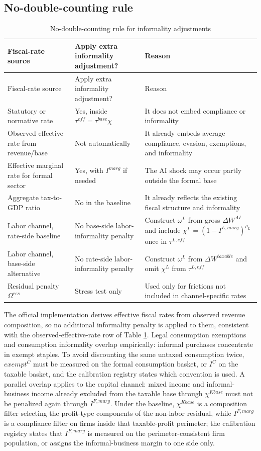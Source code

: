 \documentclass[11pt,a4paper]{article}
\begin{document}
\subsection{No-double-counting rule}

\begin{longtable}{p{}p{}p{}}
\caption{No-double-counting rule for informality adjustments}\label{tab:no_double_counting_informality}\\
\toprule
Fiscal-rate source & Apply extra informality adjustment? & Reason \\
\midrule
\endfirsthead
\toprule
Fiscal-rate source & Apply extra informality adjustment? & Reason \\
\midrule
\endhead
Statutory or normative rate & Yes, inside $\tau^{eff}=\tau^{base}\chi$ & It does not embed compliance or informality \\
Observed effective rate from revenue/base & Not automatically & It already embeds average compliance, evasion, exemptions, and informality \\
Effective marginal rate for formal sector & Yes, with $I^{marg}$ if needed & The AI shock may occur partly outside the formal base \\
Aggregate tax-to-GDP ratio & No in the baseline & It already reflects the existing fiscal structure and informality \\
Labor channel, rate-side baseline & No base-side labor-informality penalty & Construct $\omega^L$ from gross $\Delta W^{AI}$ and include $\chi^L=(1-I^{L,marg})^{\rho_L}$ once in $\tau^{L,eff}$ \\
Labor channel, base-side alternative & No rate-side labor-informality penalty & Construct $\omega^L$ from $\Delta W^{taxable}$ and omit $\chi^L$ from $\tau^{L,eff}$ \\
Residual penalty $\Omega^{res}$ & Stress test only & Used only for frictions not included in channel-specific rates \\
\bottomrule
\end{longtable}
The official implementation derives effective fiscal rates from observed revenue composition, so no additional informality penalty is applied to them, consistent with the observed-effective-rate row of Table \ref{tab:no_double_counting_informality}.
Legal consumption exemptions and consumption informality overlap empirically: informal purchases concentrate in exempt staples. To avoid discounting the same untaxed consumption twice, $exempt^C$ must be measured on the formal consumption basket, or $I^C$ on the taxable basket, and the calibration registry states which convention is used. A parallel overlap applies to the capital channel: mixed income and informal-business income already excluded from the taxable base through $\chi^{Kbase}$ must not be penalized again through $I^{F,marg}$. Under the baseline, $\chi^{Kbase}$ is a composition filter selecting the profit-type components of the non-labor residual, while $I^{F,marg}$ is a compliance filter on firms inside that taxable-profit perimeter; the calibration registry states that $I^{F,marg}$ is measured on the perimeter-consistent firm population, or assigns the informal-business margin to one side only.
\end{document}
